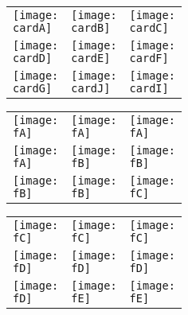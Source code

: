 \documentclass[a4paper]{article}
\newlength{\cardW}
\newlength{\cardH}
\newcommand{\cardA}{cards/boss.png}
\newcommand{\cardB}{cards/detective.png}
\newcommand{\cardC}{cards/doctor.png}
\newcommand{\cardD}{cards/godfather.png}
\newcommand{\cardE}{cards/girl.png}
\newcommand{\cardF}{cards/insane.png}
\newcommand{\cardG}{cards/jailer.png}
\newcommand{\cardJ}{cards/peeker.png}
\newcommand{\cardI}{cards/vigilante.png}
\newcommand{\fA}{cards/4lover.png}
\newcommand{\fB}{cards/4outsider.png}
\newcommand{\fC}{cards/4thug.png}
\newcommand{\fD}{cards/4villager.png}
\newcommand{\fE}{cards/4villager2.png}
\begin{document}
\pagestyle{empty}

\begin{figure}[H]
\centering
\begin{tabular}{|>{\centering\arraybackslash}m{\cardW}|>{\centering\arraybackslash}m{\cardW}|>{\centering\arraybackslash}m{\cardW}|}
    \texttt{[image: \\cardA]} &
    \texttt{[image: \\cardB]} &
    \texttt{[image: \\cardC]} \\
    \texttt{[image: \\cardD]} &
    \texttt{[image: \\cardE]} &
    \texttt{[image: \\cardF]} \\
    \texttt{[image: \\cardG]} &
    \texttt{[image: \\cardJ]} &
    \texttt{[image: \\cardI]} \\
\end{tabular}
\end{figure}


\newpage

\begin{figure}[H]
\centering
\begin{tabular}{|>{\centering\arraybackslash}m{\cardW}|>{\centering\arraybackslash}m{\cardW}|>{\centering\arraybackslash}m{\cardW}|}
    \texttt{[image: \\fA]} &
    \texttt{[image: \\fA]} &
    \texttt{[image: \\fA]} \\
    \texttt{[image: \\fA]} &
    \texttt{[image: \\fB]} &
    \texttt{[image: \\fB]} \\
    \texttt{[image: \\fB]} &
    \texttt{[image: \\fB]} &
    \texttt{[image: \\fC]} \\
\end{tabular}
\end{figure}


\newpage

\begin{figure}[H]
\centering
\begin{tabular}{|>{\centering\arraybackslash}m{\cardW}|>{\centering\arraybackslash}m{\cardW}|>{\centering\arraybackslash}m{\cardW}|}
    \texttt{[image: \\fC]} &
    \texttt{[image: \\fC]} &
    \texttt{[image: \\fC]} \\
    \texttt{[image: \\fD]} &
    \texttt{[image: \\fD]} &
    \texttt{[image: \\fD]} \\
    \texttt{[image: \\fD]} &
    \texttt{[image: \\fE]} &
    \texttt{[image: \\fE]} \\
\end{tabular}
\end{figure}
\end{document}
